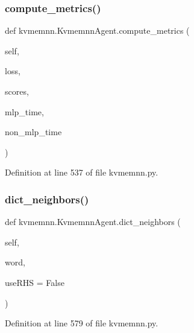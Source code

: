 \subsubsection{\texorpdfstring{compute\+\_\+metrics()}{compute\_metrics()}}
{\footnotesize\ttfamily def kvmemnn.\+Kvmemnn\+Agent.\+compute\+\_\+metrics (\begin{DoxyParamCaption}\item[{}]{self,  }\item[{}]{loss,  }\item[{}]{scores,  }\item[{}]{mlp\+\_\+time,  }\item[{}]{non\+\_\+mlp\+\_\+time }\end{DoxyParamCaption})}



Definition at line 537 of file kvmemnn.\+py.

\mbox{\label{classkvmemnn_1_1KvmemnnAgent_a7bc63414bd5f081ad88caadcc5ec543d}} 
\subsubsection{\texorpdfstring{dict\+\_\+neighbors()}{dict\_neighbors()}}
{\footnotesize\ttfamily def kvmemnn.\+Kvmemnn\+Agent.\+dict\+\_\+neighbors (\begin{DoxyParamCaption}\item[{}]{self,  }\item[{}]{word,  }\item[{}]{use\+R\+HS = {\ttfamily False} }\end{DoxyParamCaption})}



Definition at line 579 of file kvmemnn.\+py.



